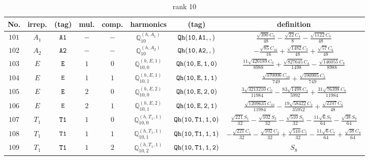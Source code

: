 \documentclass[fleqn,8pt]{jsarticle}
\begin{document}
\begin{table}[ht!]
\begin{center}
\caption{rank 10}
\renewcommand{\arraystretch}{1.3}
\begin{tabular}{cccccccc} \hline \hline
No. & irrep. & (tag) & mul. & comp. & harmonics & (tag) & definition \\ \hline
$ 101 $ & $ A_{1} $ & $ {\tt A1} $ & $ - $ & $ - $ & $ \mathbb{Q}_{10}^{(h,A_{1})} $ & $ {\tt Qh(10,A1,,)} $ & $ \frac{\sqrt{390} C_{0}}{48} - \frac{\sqrt{22} C_{4}}{8} - \frac{\sqrt{1122} C_{8}}{48} $ \\
$ 102 $ & $ A_{2} $ & $ {\tt A2} $ & $ - $ & $ - $ & $ \mathbb{Q}_{10}^{(h,A_{2})} $ & $ {\tt Qh(10,A2,,)} $ & $ - \frac{\sqrt{85} C_{10}}{16} + \frac{\sqrt{1482} C_{2}}{48} + \frac{\sqrt{57} C_{6}}{48} $ \\
$ 103 $ & $ E $ & $ {\tt E} $ & $ 1 $ & $ 0 $ & $ \mathbb{Q}_{10,0}^{(h,E,1)} $ & $ {\tt Qh(10,E,1,0)} $ & $ \frac{11 \sqrt{420189} C_{0}}{8988} + \frac{\sqrt{827645} C_{4}}{1498} - \frac{\sqrt{146055} C_{8}}{8988} $ \\
$ 104 $ & $ E $ & $ {\tt E} $ & $ 1 $ & $ 1 $ & $ \mathbb{Q}_{10,1}^{(h,E,1)} $ & $ {\tt Qh(10,E,1,1)} $ & $ \frac{\sqrt{370006} C_{10}}{749} + \frac{\sqrt{190995} C_{2}}{749} $ \\
$ 105 $ & $ E $ & $ {\tt E} $ & $ 2 $ & $ 0 $ & $ \mathbb{Q}_{10,0}^{(h,E,2)} $ & $ {\tt Qh(10,E,2,0)} $ & $ \frac{3 \sqrt{3213210} C_{0}}{11984} - \frac{83 \sqrt{1498} C_{4}}{5992} + \frac{31 \sqrt{76398} C_{8}}{11984} $ \\
$ 106 $ & $ E $ & $ {\tt E} $ & $ 2 $ & $ 1 $ & $ \mathbb{Q}_{10,1}^{(h,E,2)} $ & $ {\tt Qh(10,E,2,1)} $ & $ \frac{\sqrt{1209635} C_{10}}{11984} - \frac{19 \sqrt{58422} C_{2}}{35952} + \frac{\sqrt{2247} C_{6}}{48} $ \\
$ 107 $ & $ T_{1} $ & $ {\tt T1} $ & $ 1 $ & $ 0 $ & $ \mathbb{Q}_{10,0}^{(h,T_{1},1)} $ & $ {\tt Qh(10,T1,1,0)} $ & $ \frac{\sqrt{221} S_{1}}{32} - \frac{\sqrt{102} S_{3}}{32} - \frac{\sqrt{510} S_{5}}{32} - \frac{11 \sqrt{6} S_{7}}{64} - \frac{\sqrt{38} S_{9}}{64} $ \\
$ 108 $ & $ T_{1} $ & $ {\tt T1} $ & $ 1 $ & $ 1 $ & $ \mathbb{Q}_{10,1}^{(h,T_{1},1)} $ & $ {\tt Qh(10,T1,1,1)} $ & $ - \frac{\sqrt{221} C_{1}}{32} - \frac{\sqrt{102} C_{3}}{32} + \frac{\sqrt{510} C_{5}}{32} - \frac{11 \sqrt{6} C_{7}}{64} + \frac{\sqrt{38} C_{9}}{64} $ \\
$ 109 $ & $ T_{1} $ & $ {\tt T1} $ & $ 1 $ & $ 2 $ & $ \mathbb{Q}_{10,2}^{(h,T_{1},1)} $ & $ {\tt Qh(10,T1,1,2)} $ & $ S_{8} $ \\

\end{tabular}
\end{center}
\end{table}
\end{document}
